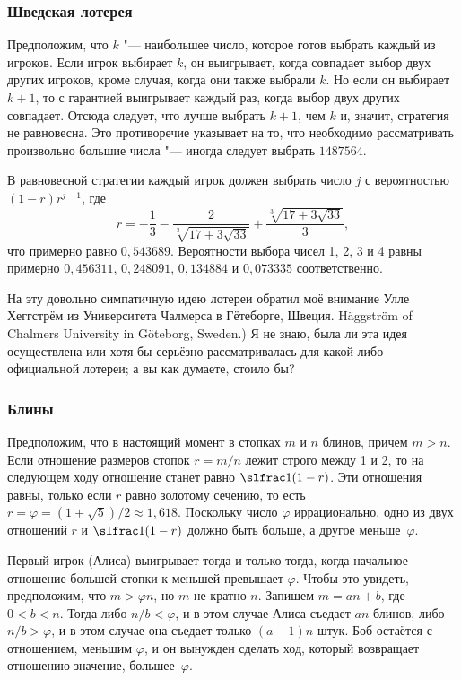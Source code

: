 \documentclass[twoside]{book}
\begin{document}
\subsubsection*{Шведская лотерея}%

Предположим, что $k$ "--- наибольшее число, которое готов выбрать каждый из игроков.
Если игрок выбирает $k$, он выигрывает, когда совпадает выбор двух других игроков, кроме случая, когда они также выбрали $k$.
Но если он выбирает $k+1$, то с гарантией выигрывает каждый раз, когда выбор двух других совпадает.
Отсюда следует, что лучше выбрать $k+1$, чем $k$ и, значит, стратегия не равновесна.
Это противоречие указывает на то, что необходимо рассматривать произвольно большие числа "--- иногда следует выбрать $1487564$.
\heart

\medskip
В равновесной стратегии каждый игрок должен выбрать число $j$ с вероятностью $(1-r)r^{j-1}$, где\vspace {-\jot}
\[r = -\frac13-\frac2{\sqrt[\scriptstyle 3]{17+3\sqrt{33}}}+\frac{\sqrt[\scriptstyle 3]{17+3\sqrt{33}}}3,\]
что примерно равно $0{,}543689$.
Вероятности выбора чисел 1, 2, 3 и 4 равны примерно $0{,}456311$, $0{,}248091$, $0{,}134884$ и $0{,}073335$ соответственно.

На эту довольно симпатичную идею лотереи обратил моё внимание Улле
Хеггстрём из Университета Чалмерса в Гётеборге, Швеция. %
Häggström of Chalmers University in Göteborg, Sweden.)  Я не знаю,
была ли эта идея осуществлена или хотя бы серьёзно рассматривалась для
какой-либо официальной лотереи; а вы как думаете, стоило бы?

\subsubsection*{Блины}%

Предположим, что в настоящий момент в стопках $m$ и $n$ блинов, причем $m > n$.
Если отношение размеров стопок $r = m/n$ лежит строго между 1 и 2, то на следующем ходу отношение станет равно $\slfrac1{(1-r)}$.
Эти отношения равны, только если $r$ равно золотому сечению,
то есть $r=\varphi=(1+\sqrt{5})/2\approx 1{,}618$.
Поскольку число $\varphi$ иррационально, одно из двух отношений $r$ и $\slfrac1{(1-r)}$ должно быть больше, а другое меньше~$\varphi$.

Первый игрок (Алиса) выигрывает тогда и только тогда, когда начальное отношение большей стопки к меньшей превышает $\varphi$.
Чтобы это увидеть, предположим, что $m>\varphi n$, но $m$ не кратно $n$.
Запишем $m=an+b$, где $0<b<n$.
Тогда либо $n/b<\varphi$, и в этом случае Алиса съедает $an$ блинов, либо $n/b>\varphi$, и в этом случае она съедает только $(a-1)n$ штук.
Боб остаётся с отношением, меньшим $\varphi$, и он вынужден сделать ход, который возвращает отношению значение, большее~$\varphi$.
\end{document}
